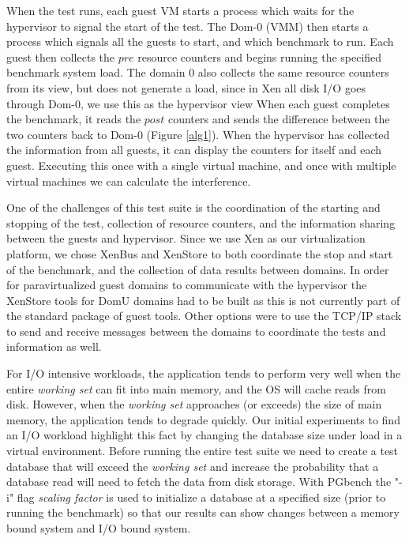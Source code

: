 When the test runs, each guest VM starts a process which waits for the hypervisor to signal the start of the test.  
 The Dom-0 (VMM) then starts a process which signals all the guests to start, and which benchmark to run.  
 Each guest then collects the $pre$ resource counters and begins running the specified benchmark system load.  
 The domain 0 also collects the same resource counters from its view, but does not generate a load, since in Xen all disk I/O goes through Dom-0, we use this as the hypervisor view  
 When each guest completes the benchmark, it reads the $post$ counters and sends the difference between the two counters back to Dom-0 (Figure \ref{alg1}).
 When the hypervisor has collected the information from all guests, it can display the counters for itself and each guest.
 Executing this once with a single virtual machine, and once with multiple virtual machines we can calculate the interference.

One of the challenges of this test suite is the coordination of the starting and stopping of the test, collection of resource counters, and the information sharing between the guests and hypervisor.  
Since we use Xen as our virtualization platform, we chose XenBus and XenStore \cite{xenbus} to both coordinate the stop and start of the benchmark, and the collection of data results between domains.
In order for paravirtualized guest domains to communicate with the hypervisor the XenStore tools for DomU domains had to be built as this is not currently part of the standard package of guest tools.  Other options were to use the TCP/IP stack to send and receive messages between the domains to coordinate the tests and information as well.

For I/O intensive workloads, the application tends to perform very well when the entire \emph{working set} can fit into main memory, and the OS will cache reads from disk.
However, when the \emph{working set}  approaches (or exceeds) the size of main memory, the application tends to degrade quickly.  
Our initial experiments to find an I/O workload highlight this fact by changing the database size under load in a virtual environment.
Before running the entire test suite we need to create a test database that will exceed the \emph{working set} and increase the probability that a database read will need to fetch the data from disk storage.  With PGbench the "-i" flag \emph{scaling factor} is used to initialize a database at a specified size (prior to running the benchmark) so that our results can show changes between a memory bound system and I/O bound system.  

